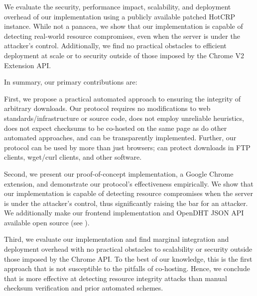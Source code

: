 We evaluate the security, performance impact, scalability, and deployment
overhead of our implementation using a publicly available patched HotCRP
instance. While not a panacea, we show that our implementation is capable of
detecting real-world resource compromises, even when the server is under the
attacker's control. Additionally, we find no practical obstacles to efficient
deployment at scale or to security outside of those imposed by the Chrome V2
Extension API.

In summary, our primary contributions are:

First, we propose a practical automated approach to ensuring the integrity of
arbitrary downloads. Our protocol requires no modifications to web
standards/infrastructure or source code, does not employ unreliable heuristics,
does not expect checksums to be co-hosted on the same page as do other automated
approaches, and can be transparently implemented. Further, our protocol can be
used by more than just browsers; \SYSTEM{} can protect downloads in FTP clients,
wget/curl clients, and other software.

Second, we present our proof-of-concept implementation, a Google Chrome
extension, and demonstrate our protocol's effectiveness empirically. We show
that our implementation is capable of detecting resource compromises when the
server is under the attacker's control, thus significantly raising the bar for
an attacker. We additionally make our frontend implementation and OpenDHT JSON
API available open source (see ).

Third, we evaluate our implementation and find marginal integration and
deployment overhead with no practical obstacles to scalability or security
outside those imposed by the Chrome API. To the best of our knowledge, this is
the first approach that is not susceptible to the pitfalls of co-hosting. Hence,
we conclude that \SYSTEM{} is more effective at detecting resource integrity
attacks than manual checksum verification and prior automated schemes.
